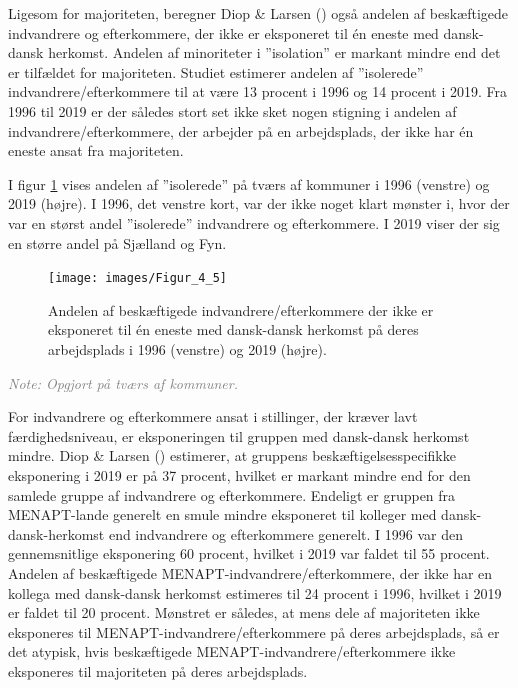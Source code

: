 \documentclass[
]{book}
\begin{document}
Ligesom for majoriteten, beregner Diop \& Larsen () også andelen af beskæftigede indvandrere og efterkommere, der ikke er eksponeret til én eneste med dansk-dansk herkomst. Andelen af minoriteter i ''isolation'' er markant mindre end det er tilfældet for majoriteten. Studiet estimerer andelen af ''isolerede'' indvandrere/efterkommere til at være 13 procent i 1996 og 14 procent i 2019. Fra 1996 til 2019 er der således stort set ikke sket nogen stigning i andelen af indvandrere/efterkommere, der arbejder på en arbejdsplads, der ikke har én eneste ansat fra majoriteten.

I figur \ref{fig:fig-5-6} vises andelen af ''isolerede'' på tværs af kommuner i 1996 (venstre) og 2019 (højre). I 1996, det venstre kort, var der ikke noget klart mønster i, hvor der var en størst andel ''isolerede'' indvandrere og efterkommere. I 2019 viser der sig en større andel på Sjælland og Fyn.

\newpage

\begin{figure}
\texttt{[image: images/Figur\_4\_5]} \caption{Andelen af beskæftigede indvandrere/efterkommere der ikke er eksponeret til én eneste med dansk-dansk herkomst på deres arbejdsplads i 1996 (venstre) og 2019 (højre).}\label{fig:fig-5-6}
\end{figure}

\begin{footnotesize}\textit{\textcolor{gray}{
Note: Opgjort på tværs af kommuner.
}}
\end{footnotesize}

For indvandrere og efterkommere ansat i stillinger, der kræver lavt færdighedsniveau, er eksponeringen til gruppen med dansk-dansk herkomst mindre. Diop \& Larsen () estimerer, at gruppens beskæftigelsesspecifikke eksponering i 2019 er på 37 procent, hvilket er markant mindre end for den samlede gruppe af indvandrere og efterkommere. Endeligt er gruppen fra MENAPT-lande generelt en smule mindre eksponeret til kolleger med dansk-dansk-herkomst end indvandrere og efterkommere generelt. I 1996 var den gennemsnitlige eksponering 60 procent, hvilket i 2019 var faldet til 55 procent. Andelen af beskæftigede MENAPT-indvandrere/efterkommere, der ikke har en kollega med dansk-dansk herkomst estimeres til 24 procent i 1996, hvilket i 2019 er faldet til 20 procent. Mønstret er således, at mens dele af majoriteten ikke eksponeres til MENAPT-indvandrere/efterkommere på deres arbejdsplads, så er det atypisk, hvis beskæftigede MENAPT-indvandrere/efterkommere ikke eksponeres til majoriteten på deres arbejdsplads.
\end{document}
